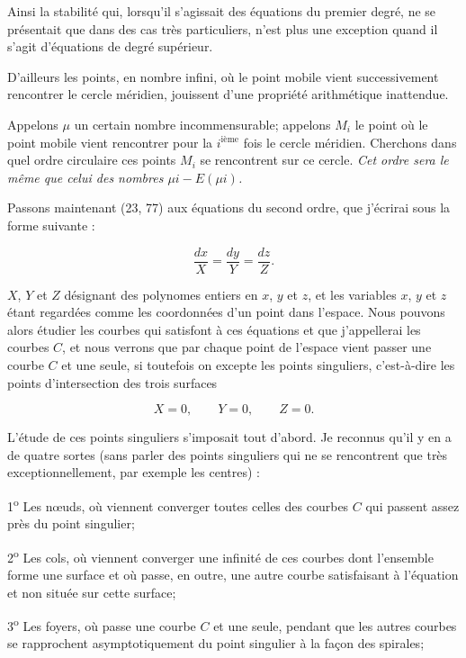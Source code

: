 \documentclass[11pt]{article}
\begin{document}
Ainsi la stabilité qui, lorsqu’il s’agissait des équations du premier degré, ne se présentait que dans des cas très particuliers, n’est plus une exception quand il s’agit d’équations de degré supérieur.

D’ailleurs les points, en nombre infini, où le point mobile vient successivement rencontrer le cercle méridien, jouissent d’une propriété arithmétique inattendue.

Appelons $\mu$ un certain nombre incommensurable; appelons $M_i$ le point où le point mobile vient rencontrer pour la $i^{\text{ième}}$ fois le cercle méridien. Cherchons dans quel ordre circulaire ces points $M_i$ se rencontrent sur ce cercle. \emph{Cet ordre sera le même que celui des nombres $\mu i-E(\mu i)$.}

Passons maintenant (23, 77) aux équations du second ordre, que j’écrirai sous la forme suivante :

\begin{equation*}
\frac{dx}{X}=\frac{dy}{Y}=\frac{dz}{Z}.
\tag{4}
\end{equation*}

$X$, $Y$ et $Z$ désignant des polynomes entiers en $x$, $y$ et $z$, et les variables $x$, $y$ et $z$ étant regardées comme les coordonnées d’un point dans l’espace. Nous pouvons alors étudier les courbes qui satisfont à ces équations et que j’appellerai les courbes $C$, et nous verrons que par chaque point de l’espace vient passer une courbe $C$ et une seule, si toutefois on excepte les points singuliers, c’est-à-dire les points d’intersection des trois surfaces

\begin{equation*}
X=0,\qquad Y=0,\qquad Z=0.
\tag{5}
\end{equation*}

L’étude de ces points singuliers s’imposait tout d’abord. Je reconnus qu’il y en a de quatre sortes (sans parler des points singuliers qui ne se rencontrent que très exceptionnellement, par exemple les centres) :

1\textsuperscript{o} Les nœuds, où viennent converger toutes celles des courbes $C$ qui passent assez près du point singulier;

2\textsuperscript{o} Les cols, où viennent converger une infinité de ces courbes dont l’ensemble forme une surface et où passe, en outre, une autre courbe satisfaisant à l’équation et non située sur cette surface;

3\textsuperscript{o} Les foyers, où passe une courbe $C$ et une seule, pendant que les autres courbes se rapprochent asymptotiquement du point singulier à la façon des spirales;
\end{document}
